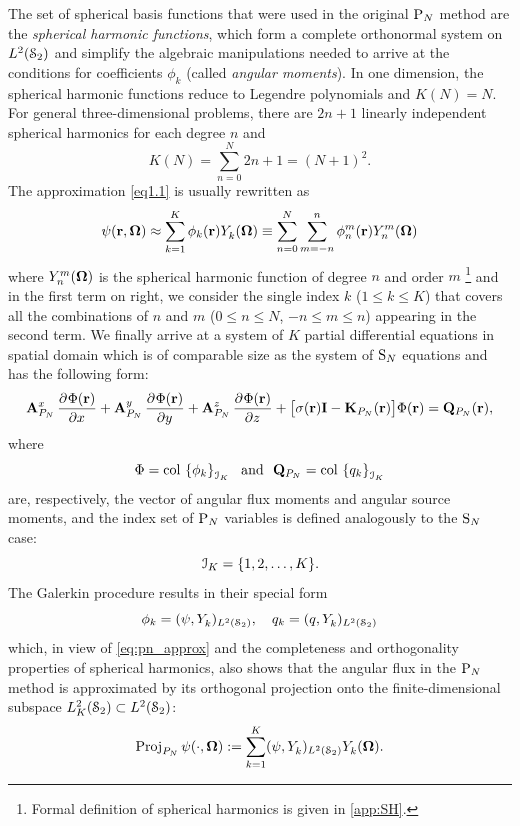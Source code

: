 The set of spherical basis functions that were used in the original $\PN$ method are the
\textit{spherical harmonic functions}, which form a complete orthonormal system on $\Lp[2](\Sphere)$ and simplify
the algebraic manipulations needed to arrive at the conditions for coefficients $\phi_k$ (called \textit{angular
moments}). In one dimension, the spherical harmonic functions reduce to Legendre polynomials and $ K(N) = N$. For
general three-dimensional problems, there are $2n + 1$ linearly independent spherical harmonics for each degree $n$ and
$$
	 K(N) = \sum_{n=0}^{N} 2n + 1 = (N+1)^2.
$$
The approximation \eqref{eq1.1} is usually rewritten as
\begin{equation}\label{eq:pn_approx}
	\psi(\br,\bomega) \approx \sum_{k=1}^{ K} \phi_k(\br)\Y{k}{}(\bomega) \equiv
	\suma[n]{0}{N}\suma[m]{-n}{n}\angmom{n}{m}(\br)\Y{n}{m}(\bomega)
\end{equation}
where $\Y{n}{m}(\bomega)$ is the spherical harmonic function of degree $n$ and order $m$ \footnote{Formal definition of
spherical harmonics is given in \ref{app:SH}.} and in the first term on right, we consider the single index $k$ ($1 \leq k \leq  K$) that covers all the combinations of $n$ and $m$  
($0 \leq n \leq N$, $-n\leq m \leq n$) appearing in the second term. We finally arrive at a system of $ K$
partial differential equations in spatial domain which is of comparable size as the system of $\SN$ equations and has the following form:
\begin{equation}\label{eq:pn1}
	\mat{A}^x_{P_N}\,\pd{\Phi(\br)}{x} + \mat{A}^y_{P_N}\,\pd{\Phi(\br)}{y} + \mat{A}^z_{P_N}\,\pd{\Phi(\br)}{z} +
	\bigl[\sigma(\br)\mat{I} - \mat{K}_{P_N}(\br)\bigr]\Phi(\br) = \mat{Q}_{P_N}(\br),
\end{equation}
where 
\begin{equation}\label{eq:pn_vectors}
	\Phi = \col\left\{\phi_k\right\}_{\idxset{K}} \ \text{ and }\ 
	\mat{Q}_{P_N} = \col\left\{q_k\right\}_{\idxset{K}}
\end{equation}
are, respectively, the vector of angular flux
moments and angular source moments, and the index set of $\PN$ variables is defined analogously to the $\SN$ case:
$$
\idxset{K} = \{1,2,\ldots,K\}.
$$
The
Galerkin procedure results in their special form
\begin{equation}\label{eq:pn_angmom}
	\phi_k = (\psi, \Y{k}{})_{\Lp[2](\Sphere)},\quad q_k = (q, \Y{k}{})_{\Lp[2](\Sphere)}
\end{equation}
which, in view of \eqref{eq:pn_approx} and the completeness and orthogonality properties of spherical harmonics, also 
shows that the angular flux in the $\PN$ method is approximated by its orthogonal projection onto the finite-dimensional
subspace $\Lp[2]_K(\Sphere)\subset\Lp[2](\Sphere)$:
\begin{equation}\label{eq:PN_proj}
	\Projop\psi(\cdot,\bomega) := \sum_{k=1}^{ K}\ips{\psi}{\Y{k}{}} \Y{k}{}(\bomega).
\end{equation}

